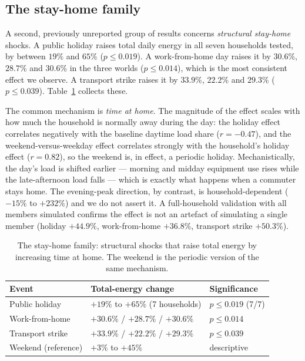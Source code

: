 \documentclass[11pt]{article}
\begin{document}
\subsection{The stay-home family}
A second, previously unreported group of results concerns \emph{structural stay-home} shocks. A public
holiday raises total daily energy in all seven households tested, by between $19\%$ and $65\%$
($p\le0.019$). A work-from-home day raises it by $30.6\%$, $28.7\%$ and $30.6\%$ in the three worlds
($p\le0.014$), which is the most consistent effect we observe. A transport strike raises it by $33.9\%$,
$22.2\%$ and $29.3\%$ ($p\le0.039$). Table~\ref{tab:stayhome} collects these.

The common mechanism is \emph{time at home}. The magnitude of the effect scales with how much the
household is normally away during the day: the holiday effect correlates negatively with the baseline
daytime load share ($r=-0.47$), and the weekend-versus-weekday effect correlates strongly with the
household's holiday effect ($r=0.82$), so the weekend is, in effect, a periodic holiday. Mechanistically,
the day's load is shifted earlier --- morning and midday equipment use rises while the late-afternoon load
falls --- which is exactly what happens when a commuter stays home. The evening-peak direction, by
contrast, is household-dependent ($-15\%$ to $+232\%$) and we do not assert it. A full-household
validation with all members simulated confirms the effect is not an artefact of simulating a single
member (holiday $+44.9\%$, work-from-home $+36.8\%$, transport strike $+50.3\%$).

\begin{table}[ht]
\centering\small
\begin{tabular}{lll}
\toprule
Event & Total-energy change & Significance \\
\midrule
Public holiday & $+19\%$ to $+65\%$ (7 households) & $p\le0.019$ (7/7) \\
Work-from-home & $+30.6\%$ / $+28.7\%$ / $+30.6\%$ & $p\le0.014$ \\
Transport strike & $+33.9\%$ / $+22.2\%$ / $+29.3\%$ & $p\le0.039$ \\
Weekend (reference) & $+3\%$ to $+45\%$ & descriptive \\
\bottomrule
\end{tabular}
\caption{The stay-home family: structural shocks that raise total energy by increasing time at home. The
weekend is the periodic version of the same mechanism.}
\label{tab:stayhome}
\end{table}
\end{document}
